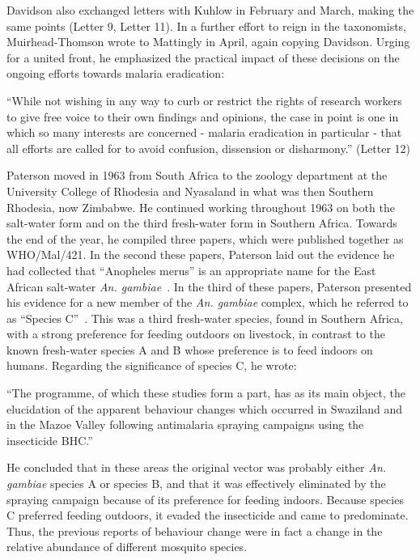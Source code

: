 \documentclass[a4paper,11pt,abstracton,hidelinks]{scrartcl}
\begin{document}
Davidson also exchanged letters with Kuhlow in February and March, making the same points (Letter 9, Letter 11).
%
In a further effort to reign in the taxonomists, Muirhead-Thomson wrote to Mattingly in April, again copying Davidson.
%
Urging for a united front, he emphasized the practical impact of these decisions on the ongoing efforts towards malaria eradication:


\begin{displayquote}
``While not wishing in any way to curb or restrict the rights of research workers to give free voice to their own findings and opinions, the case in point is one in which so many interests are concerned - malaria eradication in particular - that all efforts are called for to avoid confusion, dissension or disharmony.'' (Letter 12)
\end{displayquote}


Paterson moved in 1963 from South Africa to the zoology department at the University College of Rhodesia and Nyasaland in what was then Southern Rhodesia, now Zimbabwe.
%
He continued working throughout 1963 on both the salt-water form and on the third fresh-water form in Southern Africa.
%
Towards the end of the year, he compiled three papers, which were published together as WHO/Mal/421.
%
In the second these papers, Paterson laid out the evidence he had collected that ``Anopheles merus'' is an appropriate name for the East African salt-water \textit{An. gambiae}~\parencite{Paterson1963a}.
%
In the third of these papers, Paterson presented his evidence for a new member of the \textit{An. gambiae} complex, which he referred to as ``Species C''~\parencite{Paterson1963b}.
%
This was a third fresh-water species, found in Southern Africa, with a strong preference for feeding outdoors on livestock, in contrast to the known fresh-water species A and B whose preference is to feed indoors on humans.
%
Regarding the significance of species C, he wrote:


\begin{displayquote}
``The programme, of which these studies form a part, has as its main object, the elucidation of the apparent behaviour changes which occurred in Swaziland and in the Mazoe Valley following antimalaria spraying campaigns using the insecticide BHC.''~\parencite{Paterson1963b}
\end{displayquote}


He concluded that in these areas the original vector was probably either \textit{An. gambiae} species A or species B, and that it was effectively eliminated by the spraying campaign because of its preference for feeding indoors.
%
Because species C preferred feeding outdoors, it evaded the insecticide and came to predominate.
%
Thus, the previous reports of behaviour change were in fact a change in the relative abundance of different mosquito species.
\end{document}

